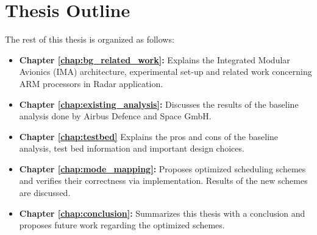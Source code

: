\section{Thesis Outline}
\label{sec:intro:outline}

The rest of this thesis is organized as follows:

\begin{itemize}
	\item \textbf{Chapter \ref{chap:bg_related_work}:} Explains the Integrated Modular Avionics (IMA) architecture, experimental set-up and related work concerning ARM processors in Radar application.

	\item \textbf{Chapter \ref{chap:existing_analysis}:} Discusses the results of the baseline analysis done by Airbus Defence and Space GmbH.

	\item \textbf{Chapter \ref{chap:testbed}} Explains the pros and cons of the baseline analysis, test bed information and important design choices.

	\item \textbf{Chapter \ref{chap:mode_mapping}:}  Proposes optimized scheduling schemes and verifies their correctness via implementation. Results of the new schemes are discussed.

	\item \textbf{Chapter \ref{chap:conclusion}:} Summarizes this thesis with a conclusion and proposes future work regarding the optimized schemes.
\end{itemize}
%

